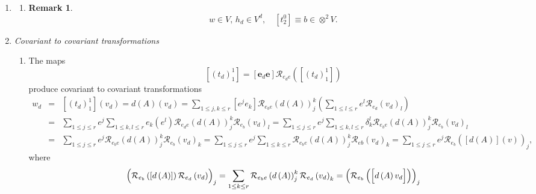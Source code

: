 \documentclass[aps,preprint]{revtex4}
\newtheorem{remark}[theorem]{Remark}
\begin{document}
\begin{enumerate}
\item 
\begin{enumerate}
\item 
\begin{remark}
\begin{equation}
w\in V,\,h_{d}\in V^{d},\quad \left[ t_{2}^{0}\right] \equiv b\in \otimes
^{2}V.
\end{equation}
\end{remark}
\end{enumerate}

\item \emph{Covariant to covariant transformations \label{Covariant to
covariant transformations}}

\begin{enumerate}
\item The maps 
\begin{equation}
\left[ \left( t_{d}\right) _{1}^{1}\right] =\left[ \boldsymbol{e}_{d}%
\boldsymbol{e}\right] \mathcal{R}_{e_{d}e}\left( \left[ \left( t_{d}\right)
_{1}^{1}\right] \right)
\end{equation}%
produce covariant to covariant transformations 
\begin{eqnarray}
w_{d} &=&\left[ \left( t_{d}\right) _{1}^{1}\right] \left( v_{d}\right)
=d\left( A\right) \left( v_{d}\right) =\sum_{1\leq j,k\leq r}\left[
e^{j}e_{k}\right] \mathcal{R}_{e_{b}e}\left( d\left( A\right) \right)
_{j}^{k}\left( \sum_{1\leq l\leq r}e^{l}\mathcal{R}_{e_{d}}\left(
v_{d}\right) _{l}\right) \\
&=&\sum_{1\leq j\leq r}e^{j}\sum_{1\leq k,l\leq r}e_{k}\left( e^{l}\right) 
\mathcal{R}_{e_{d}e}\left( d\left( A\right) \right) _{j}^{k}\mathcal{R}%
_{e_{b}}\left( v_{d}\right) _{l}=\sum_{1\leq j\leq r}e^{j}\sum_{1\leq
k,l\leq r}\delta _{k}^{l}\mathcal{R}_{e_{b}e}\left( d\left( A\right) \right)
_{j}^{k}\mathcal{R}_{e_{b}}\left( v_{d}\right) _{l} \\
&=&\sum_{1\leq j\leq r}e^{j}\mathcal{R}_{e_{b}e}\left( d\left( A\right)
\right) _{j}^{k}\mathcal{R}_{e_{b}}\left( v_{d}\right) _{k}=\sum_{1\leq
j\leq r}e^{j}\sum_{1\leq k\leq r}\mathcal{R}_{e_{b}e}\left( d\left( A\right)
\right) _{j}^{k}\mathcal{R}_{eb}\left( v_{d}\right) _{k}=\sum_{1\leq j\leq
r}e^{j}\mathcal{R}_{e_{b}}\left( \overset{}{\left[ d\left( A\right) \right]
\left( v\right) }\right) _{j},
\end{eqnarray}%
where 
\begin{equation}
\left( \overset{}{\mathcal{R}_{e_{b}}\left( \left[ d\left( A\right) \right]
\right) \mathcal{R}_{e_{d}}\left( v_{d}\right) }\right) _{j}=\sum_{1\leq
k\leq r}\mathcal{R}_{e_{b}e}\left( d\left( A\right) \right) _{j}^{k}\mathcal{%
R}_{e_{d}}\left( v_{d}\right) _{k}=\left( \mathcal{R}_{e_{b}}\left( \left[ 
\overset{}{d\left( A\right) v_{d}}\right] \right) \right) _{j}
\end{equation}
\end{enumerate}
\end{enumerate}
\end{document}
